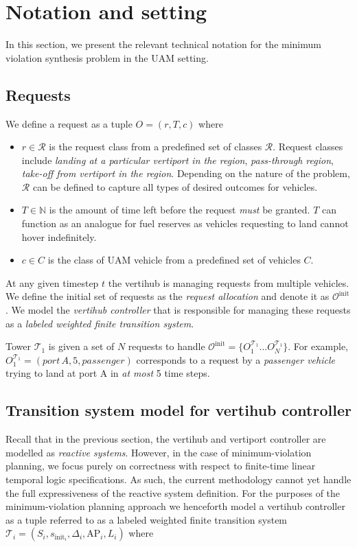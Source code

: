 \section{Notation and setting}\label{sec:background}
In this section, we present the relevant technical notation for the minimum violation synthesis problem in the UAM setting. 

%

\subsection{Requests}
We define a request as a tuple $ O = \left(r,T,c \right)$ where
\begin{itemize}
    \item $r \in \mathcal{R}$ is the request class from a predefined set of classes $
    \mathcal{R}$. Request classes include \emph{landing at a particular vertiport in the region}, \emph{pass-through region}, \emph{take-off from vertiport in the region}. Depending on the nature of the problem, $\mathcal{R}$ can be defined to capture all types of desired outcomes for vehicles.   
    \item $T \in \mathbb{N}$ is the amount of time left before the request \emph{must} be granted. $T$ can function as an analogue for fuel reserves as vehicles requesting to land cannot hover indefinitely. 
    \item $c \in C$ is the class of UAM vehicle from a predefined set of vehicles $C$.  
\end{itemize}
At any given timestep $t$ the vertihub is managing requests from multiple vehicles.  We define the initial set of requests as the \emph{request allocation} and denote it as $\mathcal{O}^{\text{init}}$. We model the \emph{vertihub controller} that is responsible for managing these requests as a 
\emph{labeled weighted finite transition system}. 
\begin{eg}
Tower $\mathcal{T}_1$ is given a set of $N$ requests to handle $\mathcal{O}^{\text{init}} = \{O^{\mathcal{T}_1}_1 \dots O^{\mathcal{T}_1}_N \}$. For example, $O^{\mathcal{T}_1}_1 = \left(port\, A, 5, passenger \right)$ corresponds to a request by a \emph{passenger vehicle} trying to land at port A in \emph{at most} 5 time steps. 
\end{eg}




\subsection{Transition system model for vertihub controller}
Recall that in the previous section, the vertihub and vertiport controller are modelled as \emph{reactive systems}. However, in the case of minimum-violation planning, we focus purely on correctness with respect to finite-time linear temporal logic specifications. As such, the current methodology cannot yet handle the full expressiveness of the reactive system definition. For the purposes of the minimum-violation planning approach we henceforth model a vertihub controller as a tuple referred to as a labeled weighted finite transition system $\mathcal{T}_i = \left(S_i, s_{\text{init}_i},\Delta_i, \text{AP}_i,L_i \right)$ where

